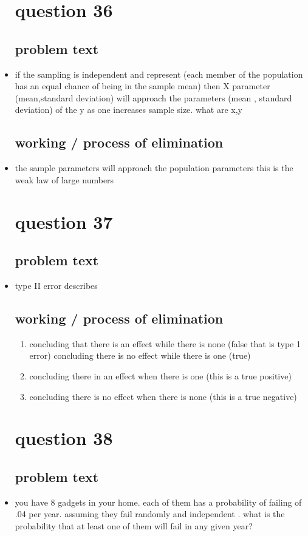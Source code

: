 \documentclass{article}
\begin{document}
\begin{itemize}
\section{question 36}
\subsection{problem text}
\item if the sampling is independent and represent (each member of the population has an equal chance of being in the sample mean) then X parameter (mean,standard deviation) will approach the parameters (mean , standard deviation) of the y as one increases sample size. what are x,y
\subsection{working / process of elimination }
\item the sample parameters will approach the population parameters this is the weak law of large numbers  


\section{question 37}
\subsection{problem text}
\item type II error describes
\subsection{working / process of elimination }
\begin{enumerate}
    \item concluding that there is an effect while there is none (false that is type 1 error) 
    \itme concluding there is no effect while there is one (true)
    \item concluding there in an effect when there is one (this is a true positive)  
    \item concluding there is no effect when there is none (this is a true negative) 
\end{enumerate}
\section{question 38}
\subsection{problem text}
\item you have 8 gadgets in your home. each of them has a probability of failing of .04 per year. assuming they fail randomly and independent . what is the probability that at least one of them will fail in any given year? 

\end{itemize}
\end{document}
